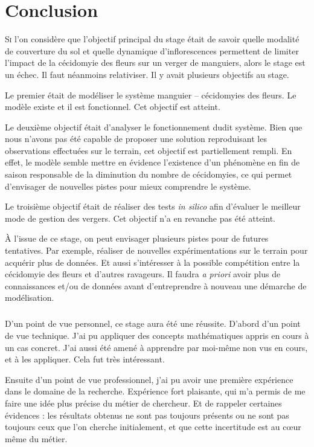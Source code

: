 \chapter{Conclusion} 

\lettrine{S}{i} l'on considère que l'objectif principal du stage était de savoir quelle modalité de couverture du sol et quelle dynamique d'inflorescences permettent de limiter l'impact de la cécidomyie des fleurs sur un verger de manguiers, alors le stage est un échec.
Il faut néanmoins relativiser. Il y avait plusieurs objectifs au stage.

Le premier était de modéliser le système manguier -- cécidomyies des fleurs.
Le modèle existe et il est fonctionnel.
Cet objectif est atteint.

Le deuxième objectif était d'analyser le fonctionnement dudit système.
Bien que nous n'avons pas été capable de proposer une solution reproduisant les observations effectuées sur le terrain, cet objectif est partiellement rempli.
En effet, le modèle semble mettre en évidence l'existence d'un phénomène en fin de saison responsable de la diminution du nombre de cécidomyies, ce qui permet 
d'envisager de nouvelles pistes pour mieux comprendre le système.

Le troisième objectif était de réaliser des tests \emph{in silico} afin d'évaluer le meilleur mode de gestion des vergers.
Cet objectif n'a en revanche pas été atteint.

À l'issue de ce stage, on peut envisager plusieurs pistes pour de futures tentatives.
Par exemple, réaliser de nouvelles expérimentations sur le terrain pour acquérir plus de données.
Et aussi s'intéresser à la possible compétition entre la cécidomyie des fleurs et d'autres ravageurs.
Il faudra \emph{a priori} avoir plus de connaissances et/ou de données avant d'entreprendre à nouveau une démarche de modélisation.

\paragraph{ } D'un point de vue personnel, ce stage aura été une réussite.
D'abord d'un point de vue technique. J'ai pu appliquer des concepts mathématiques appris en cours à un cas concret.
J'ai aussi été amené à apprendre par moi-même non vus en cours, et à les appliquer. Cela fut très intéressant.

Ensuite d'un point de vue professionnel, j'ai pu avoir une première expérience dans le domaine de la recherche.
Expérience fort plaisante, qui m'a permis de me faire une idée plus précise du métier de chercheur.
Et de rappeler certaines évidences : les résultats obtenus ne sont pas toujours présents ou ne sont pas toujours ceux que l'on cherche initialement, et que cette incertitude est au cœur même du métier.

